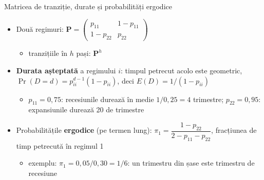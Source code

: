 \begin{frame}{Matricea de tranziție, durate și probabilități ergodice}
\itemsize{\small}
\begin{itemize}
    \item Două regimuri: $\mathbf{P} = \begin{pmatrix}p_{11} & 1 - p_{11}\\ 1 - p_{22} & p_{22}\end{pmatrix}$
    \begin{itemize}
        \item tranzițiile în $h$ pași: $\mathbf{P}^h$
    \end{itemize}
    \item \textbf{Durata așteptată} a regimului $i$: timpul petrecut acolo este geometric, $\Pr(D = d) = p_{ii}^{d-1}(1 - p_{ii})$, deci $E(D) = 1/(1 - p_{ii})$
    \begin{itemize}
        \item $p_{11} = 0{,}75$: recesiunile durează în medie $1/0{,}25 = 4$ trimestre; $p_{22} = 0{,}95$: expansiunile durează 20 de trimestre
    \end{itemize}
    \item Probabilitățile \textbf{ergodice} (pe termen lung): $\pi_1 = \dfrac{1 - p_{22}}{2 - p_{11} - p_{22}}$, fracțiunea de timp petrecută în regimul 1
    \begin{itemize}
        \item exemplu: $\pi_1 = 0{,}05/0{,}30 = 1/6$: un trimestru din șase este trimestru de recesiune
    \end{itemize}
\end{itemize}
\end{frame}

